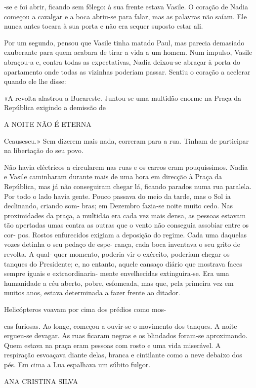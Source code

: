 ‑se e foi abrir, ficando sem fôlego: à sua frente estava Vasile. O
coração de Nadia começou a cavalgar e a boca abriu‑se para falar, mas as
palavras não saíam. Ele nunca antes tocara à sua porta e não era sequer
suposto estar ali.

Por um segundo, pensou que Vasile tinha matado Paul, mas parecia
demasiado exuberante para quem acabara de tirar a vida a um homem. Num
impulso, Vasile abraçou‑a e, contra todas as expectativas, Nadia
deixou‑se abraçar à porta do apartamento onde todas as vizinhas poderiam
passar. Sentiu o coração a acelerar quando ele lhe disse:

«A revolta alastrou a Bucareste. Juntou‑se uma multidão enorme na Praça
da República exigindo a demissão de

A NOITE NÃO É ETERNA

Ceausescu.» Sem dizerem mais nada, correram para a rua. Tinham de
participar na libertação do seu povo.

Não havia eléctricos a circularem nas ruas e os carros eram
pouquíssimos. Nadia e Vasile caminharam durante mais de uma hora em
direcção à Praça da República, mas já não conseguiram chegar lá, ficando
parados numa rua paralela. Por todo o lado havia gente. Pouco passava do
meio da tarde, mas o Sol ia declinando, criando som‑ bras; em Dezembro
fazia‑se noite muito cedo. Nas proximidades da praça, a multidão era
cada vez mais densa, as pessoas estavam tão apertadas umas contra as
outras que o vento não conseguia assobiar entre os cor‑ pos. Rostos
enfurecidos exigiam a deposição do regime. Cada uma daquelas vozes
detinha o seu pedaço de espe‑ rança, cada boca inventava o seu grito de
revolta. A qual‑ quer momento, poderia vir o exército, poderiam chegar
os tanques do Presidente; e, no entanto, aquele cansaço diário que
mostrava faces sempre iguais e extraordinaria‑ mente envelhecidas
extinguira‑se. Era uma humanidade a céu aberto, pobre, esfomeada, mas
que, pela primeira vez em muitos anos, estava determinada a fazer frente
ao ditador.

Helicópteros voavam por cima dos prédios como mos‑

cas furiosas. Ao longe, começou a ouvir‑se o movimento dos tanques. A
noite ergueu‑se devagar. As ruas ficaram negras e os blindados foram‑se
aproximando. Quem estava na praça eram pessoas com rosto e uma vida
miserável. A respiração esvoaçava diante delas, branca e cintilante como
a neve debaixo dos pés. Em cima a Lua espalhava um súbito fulgor.

ANA CRISTINA SILVA

